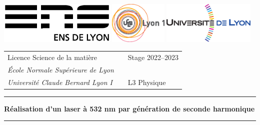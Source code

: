 \documentclass[11pt,a4paper] { article}
\begin{document}
\setlength{\parindent}{0pt}

\hypersetup{pageanchor=false}
\thispagestyle{empty}

\begin{@empty}

\includegraphics[height=2cm]{logoens.eps} \hfill \includegraphics[height=2cm]{logoucbl.eps} \hfill \includegraphics[height=2cm]{logounivlyon.eps}

\vspace{0.5cm}

\begin{tabularx}{\textwidth}{@{} l X l @{} }
{\sc Licence Science de la matière} 	&	& Stage 2022--2023 \\
{\it \'Ecole Normale Sup\'erieure de Lyon}		&	&  \\
{\it Universit\'e Claude Bernard Lyon I}		& 	& L3 Physique
\end{tabularx}

\begin{center}

\vspace{1.5cm}

\rule[11pt]{5cm}{0.5pt}

\textbf{\huge Réalisation d'un laser à 532 nm par génération de seconde harmonique}

\rule{5cm}{0.5pt}

\vspace{1.5cm}


\end{center}
\end{@empty}
\end{document}
